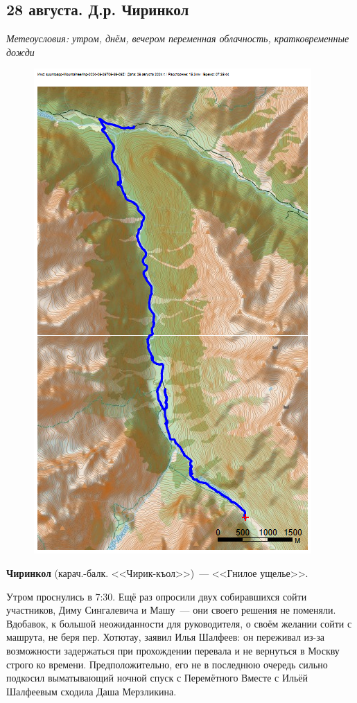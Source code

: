 \subsection{28 августа. Д.р. Чиринкол}

\textit{Метеоусловия: утром, днём, вечером переменная облачность, кратковременные дожди}

\begin{figure}[h!]
	\centering
	\includegraphics[angle=0, width=0.7\linewidth]{../pics/mini_maps/28}
	\label{fig:mini_28}
\end{figure}

\textbf{Чиринкол} (карач.-балк. <<Чирик-къол>>)~--- <<Гнилое ущелье>>.

Утром проснулись в 7:30. Ещё раз опросили двух собиравшихся сойти участников, Диму Сингалевича и Машу~--- они своего решения не поменяли. Вдобавок, к большой неожиданности для руководителя, о своём желании сойти с машрута, не беря пер. Хотютау, заявил Илья Шалфеев: он переживал из-за возможности задержаться при прохождении перевала и не вернуться в Москву строго ко времени. Предположительно, его не в последнюю очередь сильно подкосил выматывающий ночной спуск с Перемётного Вместе с Ильёй Шалфеевым сходила Даша Мерзликина.


